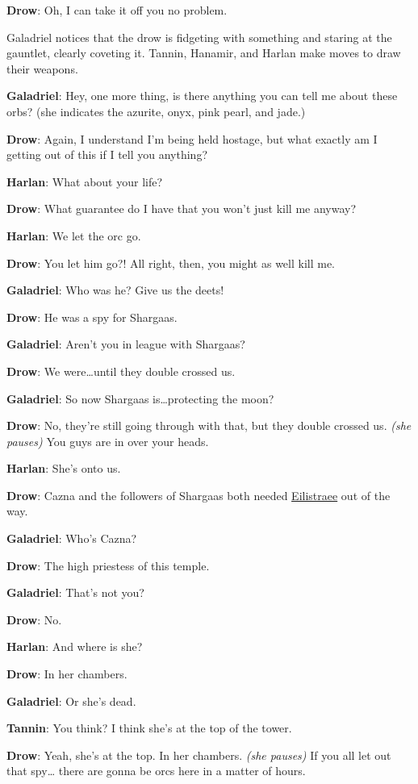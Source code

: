 \documentclass[smalldemyvopaper,11pt,twoside,onecolumn,openright,extrafontsizes]{memoir}
\begin{document}
\textbf{Drow}: Oh, I can take it off you no problem.

Galadriel notices that the drow is fidgeting with something and staring
at the gauntlet, clearly coveting it. Tannin, Hanamir, and Harlan make
moves to draw their weapons.

\textbf{Galadriel}: Hey, one more thing, is there anything you can tell
me about these orbs? (she indicates the azurite, onyx, pink pearl, and
jade.)

\textbf{Drow}: Again, I understand I'm being held hostage, but what
exactly am I getting out of this if I tell you anything?

\textbf{Harlan}: What about your life?

\textbf{Drow}: What guarantee do I have that you won't just kill me
anyway?

\textbf{Harlan}: We let the orc go.

\textbf{Drow}: You let him go?! All right, then, you might as well kill
me.

\textbf{Galadriel}: Who was he? Give us the deets!

\textbf{Drow}: He was a spy for Shargaas.

\textbf{Galadriel}: Aren't you in league with Shargaas?

\textbf{Drow}: We were\ldots until they double crossed us.

\textbf{Galadriel}: So now Shargaas is\ldots protecting the moon?

\textbf{Drow}: No, they're still going through with that, but they
double crossed us. \emph{(she pauses)} You guys are in over your heads.

\textbf{Harlan}: She's onto us.

\textbf{Drow}: Cazna and the followers of Shargaas both needed
\href{/characters/eilistraee/}{Eilistraee} out of the way.

\textbf{Galadriel}: Who's Cazna?

\textbf{Drow}: The high priestess of this temple.

\textbf{Galadriel}: That's not you?

\textbf{Drow}: No.

\textbf{Harlan}: And where is she?

\textbf{Drow}: In her chambers.

\textbf{Galadriel}: Or she's dead.

\textbf{Tannin}: You think? I think she's at the top of the tower.

\textbf{Drow}: Yeah, she's at the top. In her chambers. \emph{(she
pauses)} If you all let out that spy\ldots{} there are gonna be orcs
here in a matter of hours.
\end{document}
